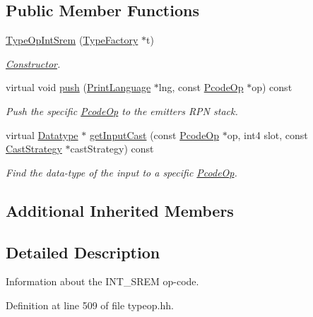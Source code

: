 \subsection*{Public Member Functions}
\begin{DoxyCompactItemize}
\item 
\mbox{\hyperlink{class_type_op_int_srem_a1505a1a06a4f1d9c4a7d465054bc2f11}{Type\+Op\+Int\+Srem}} (\mbox{\hyperlink{class_type_factory}{Type\+Factory}} $\ast$t)
\begin{DoxyCompactList}\small\item\em \mbox{\hyperlink{class_constructor}{Constructor}}. \end{DoxyCompactList}\item 
virtual void \mbox{\hyperlink{class_type_op_int_srem_a142ba3344986bb407eca6f71efd85cb8}{push}} (\mbox{\hyperlink{class_print_language}{Print\+Language}} $\ast$lng, const \mbox{\hyperlink{class_pcode_op}{Pcode\+Op}} $\ast$op) const
\begin{DoxyCompactList}\small\item\em Push the specific \mbox{\hyperlink{class_pcode_op}{Pcode\+Op}} to the emitter\textquotesingle{}s R\+PN stack. \end{DoxyCompactList}\item 
virtual \mbox{\hyperlink{class_datatype}{Datatype}} $\ast$ \mbox{\hyperlink{class_type_op_int_srem_a92bf8a1a1ff73b5f0ff6f9d05fdfe7fa}{get\+Input\+Cast}} (const \mbox{\hyperlink{class_pcode_op}{Pcode\+Op}} $\ast$op, int4 slot, const \mbox{\hyperlink{class_cast_strategy}{Cast\+Strategy}} $\ast$cast\+Strategy) const
\begin{DoxyCompactList}\small\item\em Find the data-\/type of the input to a specific \mbox{\hyperlink{class_pcode_op}{Pcode\+Op}}. \end{DoxyCompactList}\end{DoxyCompactItemize}
\subsection*{Additional Inherited Members}


\subsection{Detailed Description}
Information about the I\+N\+T\+\_\+\+S\+R\+EM op-\/code. 

Definition at line 509 of file typeop.\+hh.



